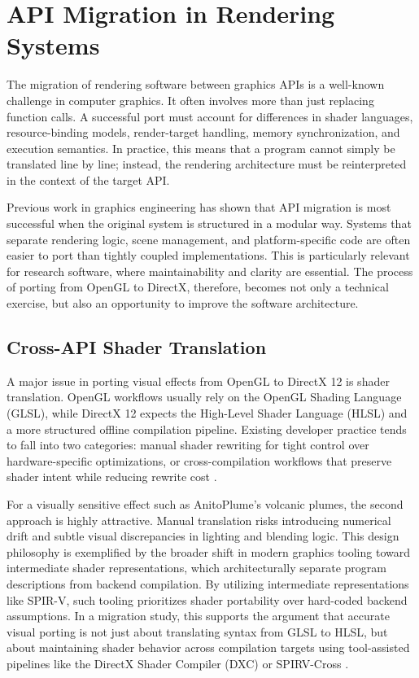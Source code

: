 \section{API Migration in Rendering Systems}
The migration of rendering software between graphics APIs is a well-known challenge in computer graphics. It often involves more than just replacing function calls. A successful port must account for differences in shader languages, resource-binding models, render-target handling, memory synchronization, and execution semantics. In practice, this means that a program cannot simply be translated line by line; instead, the rendering architecture must be reinterpreted in the context of the target API.

Previous work in graphics engineering has shown that API migration is most successful when the original system is structured in a modular way. Systems that separate rendering logic, scene management, and platform-specific code are often easier to port than tightly coupled implementations. This is particularly relevant for research software, where maintainability and clarity are essential. The process of porting from OpenGL to DirectX, therefore, becomes not only a technical exercise, but also an opportunity to improve the software architecture.

\subsection{Cross-API Shader Translation}
A major issue in porting visual effects from OpenGL to DirectX 12 is shader translation. OpenGL workflows usually rely on the OpenGL Shading Language (GLSL), while DirectX 12 expects the High-Level Shader Language (HLSL) and a more structured offline compilation pipeline. Existing developer practice tends to fall into two categories: manual shader rewriting for tight control over hardware-specific optimizations, or cross-compilation workflows that preserve shader intent while reducing rewrite cost \cite{Capodieci2022}. 

For a visually sensitive effect such as AnitoPlume's volcanic plumes, the second approach is highly attractive. Manual translation risks introducing numerical drift and subtle visual discrepancies in lighting and blending logic. This design philosophy is exemplified by the broader shift in modern graphics tooling toward intermediate shader representations, which architecturally separate program descriptions from backend compilation. By utilizing intermediate representations like SPIR-V, such tooling prioritizes shader portability over hard-coded backend assumptions. In a migration study, this supports the argument that accurate visual porting is not just about translating syntax from GLSL to HLSL, but about maintaining shader behavior across compilation targets using tool-assisted pipelines like the DirectX Shader Compiler (DXC) or SPIRV-Cross \cite{kinkor2022easy}.
